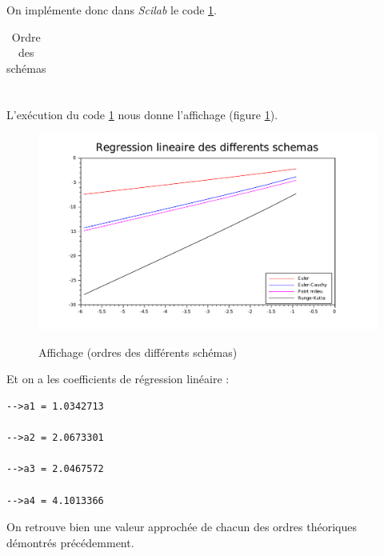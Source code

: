 \documentclass[a4paper,10pt]{report}
\begin{document}
On implémente donc dans \textit{Scilab} le code \ref{code_ordre}.
\begin{table}[H]
\caption{Ordre des schémas}
\begin{tabular}{l}

\label{code_ordre}
\end{tabular}
\end{table}

\begin{table}[H]
\begin{tabular}{l}

\end{tabular}
\end{table}

L'exécution du code \ref{code_ordre} nous donne l'affichage (figure \ref{graph_ordre}).
\begin{figure}[H]
\centering
\caption{Affichage (ordres des différents schémas)}
\includegraphics[width=\textwidth]{ordre.pdf}
\label{graph_ordre}
\end{figure}

Et on a les coefficients de régression linéaire :
\begin{verbatim}
-->a1 = 1.0342713  
 
-->a2 = 2.0673301  
 
-->a3 = 2.0467572  
 
-->a4 = 4.1013366 
\end{verbatim}
On retrouve bien une valeur approchée de chacun des ordres théoriques démontrés précédemment.
\end{document}
